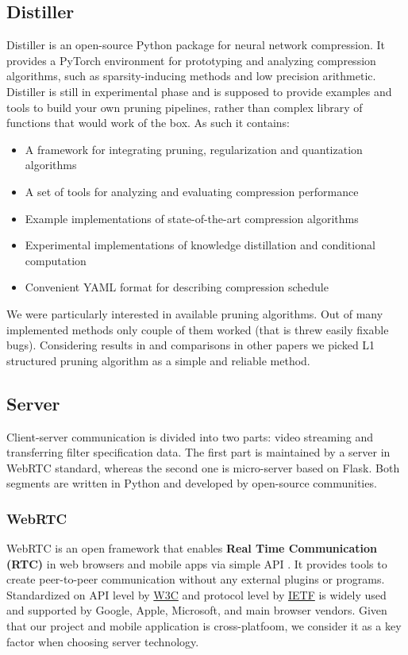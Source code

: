 \documentclass[../Main.tex]{subfiles}
\begin{document}
    \subsection{Distiller}
    Distiller\cite{distiller} is an open-source Python package for neural network compression.
    It provides a PyTorch environment for prototyping and analyzing compression algorithms,
    such as sparsity-inducing methods and low precision arithmetic. Distiller
    is still in experimental phase and is supposed to provide examples and tools
    to build your own pruning pipelines, rather than complex library of functions
    that would work of the box. As such it contains:
    \begin{itemize}
    \item A framework for integrating pruning, regularization and quantization algorithms
    \item A set of tools for analyzing and evaluating compression performance
    \item Example implementations of state-of-the-art compression algorithms
    \item Experimental implementations of knowledge distillation and conditional
          computation
    \item Convenient YAML format for describing compression schedule
    \end{itemize}
    We were particularly interested in available pruning algorithms.
    Out of many implemented methods only couple of them worked (that is threw easily
    fixable bugs). Considering results in \cite{li2016pruning} and comparisons
    in other papers we picked L1 structured pruning algorithm as a simple and reliable 
    method.

\subsection{Server}
    Client-server communication is divided into two parts: video streaming and transferring filter specification data. The first part is maintained by a server in WebRTC standard, whereas the second one is micro-server based on Flask. Both segments are written in Python and developed by open-source communities.

    \subsubsection{WebRTC}
    WebRTC is an open framework that enables \textbf{Real Time Communication (RTC)} in web browsers and mobile apps via simple API \cite{webrtc}. It provides tools to create peer-to-peer communication without any external plugins or programs. Standardized on API level by \href{https://www.w3.org}{W3C} and protocol level by \href{https://ietf.org}{IETF} is widely used and supported by Google, Apple, Microsoft, and main browser vendors. Given that our project and mobile application is cross-platfoom, we consider it as a key factor when choosing server technology.
    
\end{document}
